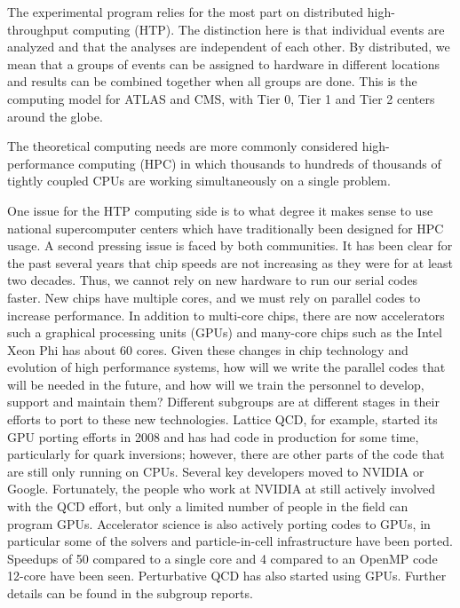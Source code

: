 The experimental program relies for the most part on distributed
high-throughput computing (HTP).  The distinction here is that 
individual events are analyzed and that the analyses are
independent of each other.  By distributed, we mean that a groups
of events can be assigned to hardware in different locations and
results can be combined together when all groups are done.  This
is the computing model for ATLAS and CMS, with Tier 0, Tier 1 and
Tier 2 centers around the globe.

The theoretical computing needs are more commonly considered high-performance
computing (HPC) in which thousands to hundreds of thousands of tightly
coupled CPUs are working simultaneously on a single problem.

One issue for the HTP computing side is to what degree it makes sense to
use national supercomputer centers which have traditionally been designed
for HPC usage.  A second pressing issue is faced by both communities.
It has been clear for the past several years that chip speeds are not
increasing as they were for at least two decades.  Thus, we cannot
rely on new hardware to run our serial codes faster.  New chips
have multiple cores, and we must rely on parallel codes to increase
performance.  In addition to multi-core chips, there are now
accelerators such a graphical processing units (GPUs) and many-core
chips such as the Intel Xeon Phi has about 60 cores.
Given these changes in chip technology and evolution of
high performance systems,
how will we write the parallel codes that will be
needed in the future, and how will we train the personnel to
develop, support and maintain them?
Different subgroups are at different stages in their efforts to
port to these new technologies.  Lattice QCD, for example,
started its GPU porting efforts in 2008 and has had code in 
production for some time, particularly for quark inversions;
however, there are other parts of the code that are still only
running on CPUs.  Several key developers moved to
NVIDIA or Google.  Fortunately, the people who work at NVIDIA
at still actively involved with the QCD effort,  but only a limited number of
people in the field can program GPUs.
Accelerator science is also actively porting codes to GPUs, in 
particular some of the solvers and particle-in-cell infrastructure
have been ported.  Speedups of 50 compared to a single core and
4 compared to an OpenMP code 12-core have been seen.
Perturbative QCD has also started using GPUs.
Further details can be found in the subgroup reports.


